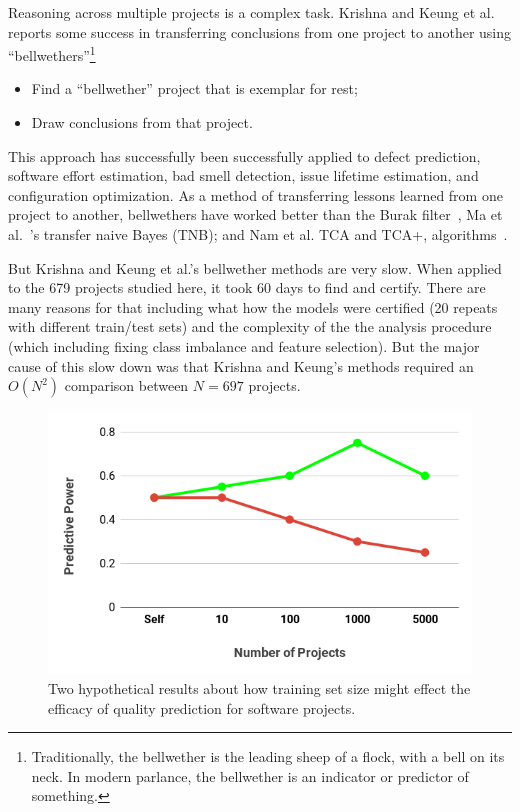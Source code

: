 \documentclass[10pt,journal,compsoc]{IEEEtran}
\newcommand{\bi}{\begin{itemize}}
\newcommand{\ei}{\end{itemize}}
\begin{document}
Reasoning across multiple projects is a complex task.
Krishna and Keung et al. reports some success in transferring conclusions from one project to another using ``bellwethers''\footnote{Traditionally,
the bellwether is the  leading sheep of a flock, with a bell on its neck.
In modern parlance, the bellwether is an 
  indicator or predictor of something.}
\bi
\item Find a  ``bellwether'' project that is exemplar for rest;
\item Draw conclusions from  that project.
\ei
This approach has successfully been successfully applied to defect prediction, software effort estimation, bad smell detection, issue lifetime estimation, and configuration optimization. As a 
method of transferring lessons learned from one project to another, bellwethers have worked better than the Burak filter~\cite{turhan09}, Ma et al.~\cite{Ma2012}'s transfer naive Bayes (TNB); and Nam et al.  TCA  and TCA+, algorithms~\cite{Nam13,Nam2015}.

But Krishna and Keung et al.'s bellwether methods are very slow. When applied to the 679 projects studied here, it took 60 days to find and certify. There are many reasons for that including what how the models were certified (20 repeats  with different train/test sets)
and the complexity of the the analysis procedure (which including fixing class imbalance and feature selection). But the major cause of this slow down was that Krishna and Keung's   methods  required an $O(N^2)$ comparison between   $N=697$ projects.

\begin{figure}[!bh]
    \centering
    \includegraphics[width=\linewidth]{figs/predictive_power.png}
    \caption{Two hypothetical results about how training set size might effect the efficacy of quality prediction for software projects.}
    \label{fig:predictive_power}
\end{figure}
\end{document}
